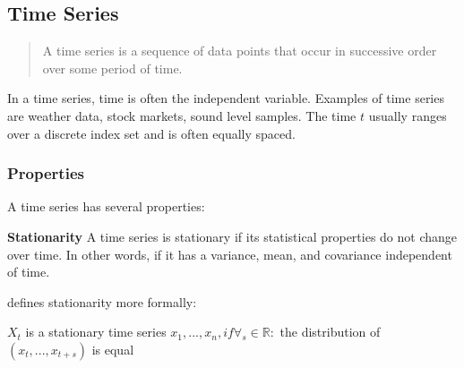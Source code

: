 \subsection{Time Series}
\label{sec:time-series}
\begin{quote}
    A time series is a sequence of data
    points that occur in successive order over some period of time.
\end{quote}
\cite{Hayes}

In a time series, time is often the independent variable.
Examples of time series are weather data, stock markets, sound level samples.
The time $t$ usually ranges over a discrete index set and is often equally spaced.

\subsubsection{Properties}
A time series has several properties:


\textbf{Stationarity}
A time series is stationary if its statistical properties do not change over time.
In other words, if it has a variance, mean, and covariance independent of time.

\cite{RobJHyndman2014} defines stationarity more formally:
\begin{definition}
    $X_t$ is a stationary time series
    $x_1, ..., x_n, if \forall_s \in \mathbb{R} :$
    the distribution of $(x_t, ..., x_{t+s})$ is equal
\end{definition}

